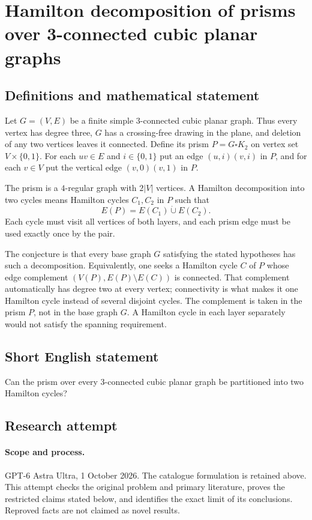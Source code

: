 \documentclass[11pt,a4paper]{article}
\begin{document}
\section*{Hamilton decomposition of prisms over 3-connected cubic planar graphs}\label{statement}

\subsection{Definitions and mathematical statement}
Let $G=(V,E)$ be a finite simple $3$-connected cubic planar
graph. Thus every vertex has degree three, $G$ has a
crossing-free drawing in the plane, and deletion of any
two vertices leaves it connected. Define its prism
$P=G\square K_2$ on vertex set $V\times\{0,1\}$.
For each $uv\in E$ and $i\in\{0,1\}$ put an edge
$(u,i)(v,i)$ in $P$, and for each $v\in V$ put the
vertical edge $(v,0)(v,1)$ in $P$.

The prism is a $4$-regular graph with $2|V|$ vertices.
A Hamilton decomposition into two cycles means Hamilton
cycles $C_1,C_2$ in $P$ such that
\[
 E(P)=E(C_1)\mathbin{\dot\cup}E(C_2).
\]
Each cycle must visit all vertices of both layers, and
each prism edge must be used exactly once by the pair.

The conjecture is that every base graph $G$ satisfying
the stated hypotheses has such a decomposition. Equivalently,
one seeks a Hamilton cycle $C$ of $P$ whose edge complement
$(V(P),E(P)\setminus E(C))$ is connected. That complement
automatically has degree two at every vertex; connectivity
is what makes it one Hamilton cycle instead of several
disjoint cycles. The complement is taken in the prism $P$,
not in the base graph $G$. A Hamilton cycle in each layer
separately would not satisfy the spanning requirement.
\subsection{Short English statement}
Can the prism over every 3-connected cubic planar graph be partitioned into two Hamilton cycles?
\subsection{Research attempt}
\paragraph{Scope and process.}
GPT-6 Astra Ultra, 1 October 2026. The catalogue formulation is retained above. This attempt checks the original problem and primary literature, proves the restricted claims stated below, and identifies the exact limit of its conclusions. Reproved facts are not claimed as novel results.
\end{document}
